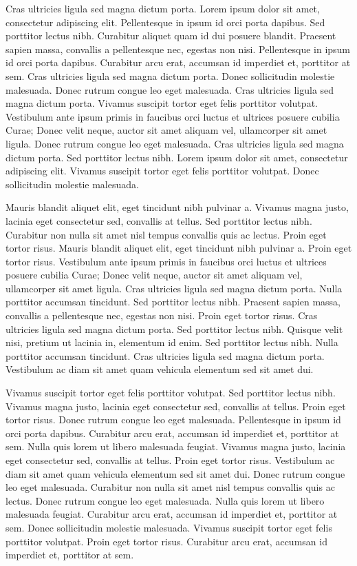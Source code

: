 \documentclass{article}
\begin{document}
\beginnumbering
\autopar
Cras ultricies ligula sed magna dictum porta. Lorem ipsum dolor sit amet, consectetur adipiscing elit. Pellentesque in ipsum id orci porta dapibus. Sed porttitor lectus nibh. Curabitur aliquet quam id dui posuere blandit. Praesent sapien massa, convallis a pellentesque nec, egestas non nisi. Pellentesque in ipsum id orci porta dapibus. Curabitur arcu erat, accumsan id imperdiet et, porttitor at sem. Cras ultricies ligula sed magna dictum porta. Donec sollicitudin molestie malesuada. Donec rutrum congue leo eget malesuada. Cras ultricies ligula sed magna dictum porta. Vivamus suscipit tortor eget felis porttitor volutpat. Vestibulum ante ipsum primis in faucibus orci luctus et ultrices posuere cubilia Curae; Donec velit neque, auctor sit amet aliquam vel, ullamcorper sit amet ligula. Donec rutrum congue leo eget malesuada. Cras ultricies ligula sed magna dictum porta. Sed porttitor lectus nibh. Lorem ipsum dolor sit amet, consectetur adipiscing elit. Vivamus suscipit tortor eget felis porttitor volutpat. Donec sollicitudin molestie malesuada.

Mauris blandit aliquet elit, eget tincidunt nibh pulvinar a. Vivamus magna justo, lacinia eget consectetur sed, convallis at tellus. Sed porttitor lectus nibh. Curabitur non nulla sit amet nisl tempus convallis quis ac lectus. Proin eget tortor risus. Mauris blandit aliquet elit, eget tincidunt nibh pulvinar a. Proin eget tortor risus. Vestibulum ante ipsum primis in faucibus orci luctus et ultrices posuere cubilia Curae; Donec velit neque, auctor sit amet aliquam vel, ullamcorper sit amet ligula. Cras ultricies ligula sed magna dictum porta. Nulla porttitor accumsan tincidunt. Sed porttitor lectus nibh. Praesent sapien massa, convallis a pellentesque nec, egestas non nisi. Proin eget tortor risus. Cras ultricies ligula sed magna dictum porta. Sed porttitor lectus nibh. Quisque velit nisi, pretium ut lacinia in, elementum id enim. Sed porttitor lectus nibh. Nulla porttitor accumsan tincidunt. Cras ultricies ligula sed magna dictum porta. Vestibulum ac diam sit amet quam vehicula elementum sed sit amet dui.

Vivamus suscipit tortor eget felis porttitor volutpat. Sed porttitor lectus nibh. Vivamus magna justo, lacinia eget consectetur sed, convallis at tellus. Proin eget tortor risus. Donec rutrum congue leo eget malesuada. Pellentesque in ipsum id orci porta dapibus. Curabitur arcu erat, accumsan id imperdiet et, porttitor at sem. Nulla quis lorem ut libero malesuada feugiat. Vivamus magna justo, lacinia eget consectetur sed, convallis at tellus. Proin eget tortor risus. Vestibulum ac diam sit amet quam vehicula elementum sed sit amet dui. Donec rutrum congue leo eget malesuada. Curabitur non nulla sit amet nisl tempus convallis quis ac lectus. Donec rutrum congue leo eget malesuada. Nulla quis lorem ut libero malesuada feugiat. Curabitur arcu erat, accumsan id imperdiet et, porttitor at sem. Donec sollicitudin molestie malesuada. Vivamus suscipit tortor eget felis porttitor volutpat. Proin eget tortor risus. Curabitur arcu erat, accumsan id imperdiet et, porttitor at sem.
\end{document}
